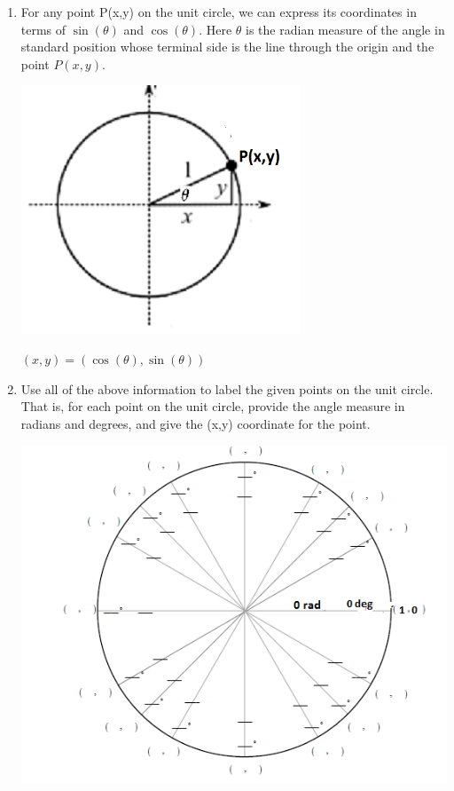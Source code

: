 \documentclass[nooutcomes,handout]{ximera}
\begin{document}
\begin{problem}
\begin{enumerate}
	\item 
For any point P(x,y) on the unit circle, we can express its coordinates in terms of $\sin(\theta)$ and $\cos(\theta)$.
Here $\theta$ is the radian measure of the angle in standard position whose terminal side is the line through the origin and the point $P(x,y)$.
\begin{image}
		\includegraphics[scale=.8]{figure13.png}
		\end{image}
		\begin{freeResponse}
	$(x,y)=(\cos(\theta),\sin(\theta))$
	\end{freeResponse}

	\item  Use all of the above information to label the given points on the unit circle.  That is, for each point on the unit circle, provide the angle measure in radians and degrees, and give the (x,y) coordinate for the point.
		\begin{image}
		\includegraphics{figure6.png}
		\end{image}


\end{enumerate}
\end{problem}
\end{document}
